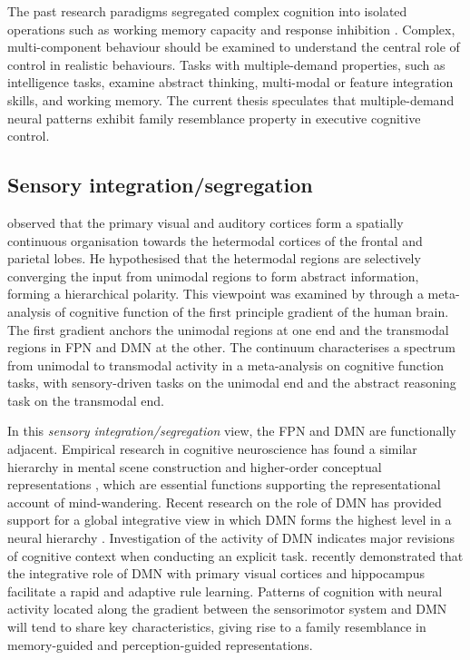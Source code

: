 The past research paradigms segregated complex cognition into isolated operations such as working memory capacity \cite{Vogel2004} and response inhibition \cite{Aron2004}. Complex, multi-component behaviour should be examined to understand the central role of control in realistic behaviours. Tasks with multiple-demand properties, such as intelligence tasks, examine abstract thinking, multi-modal or feature integration skills, and working memory. The current thesis speculates that multiple-demand neural patterns exhibit family resemblance property in executive cognitive control. 

\subsection{Sensory integration/segregation}
 observed that the primary visual and auditory cortices form a spatially continuous organisation towards the hetermodal cortices of the frontal and parietal lobes. He hypothesised that the hetermodal regions are selectively converging the input from unimodal regions to form abstract information, forming a hierarchical polarity. This viewpoint was examined by  through a meta-analysis of cognitive function of the first principle gradient of the human brain. The first gradient anchors the unimodal regions at one end and the transmodal regions in FPN and DMN at the other. The continuum characterises a spectrum from unimodal to transmodal activity in a meta-analysis on cognitive function tasks, with sensory-driven tasks on the unimodal end and the abstract reasoning task on the transmodal end.

In this \textit{sensory integration/segregation} view, the FPN and DMN are functionally adjacent. Empirical research in cognitive neuroscience has found a similar hierarchy in mental scene construction \cite{Villena-Gonzalez2018} and higher-order conceptual representations \cite{Murphy2018}, which are essential functions supporting the representational account of mind-wandering. Recent research on the role of DMN has provided support for a global integrative view in which DMN forms the highest level in a neural hierarchy \cite{Margulies2016}. Investigation of the activity of DMN indicates major revisions of cognitive context when conducting an explicit task.  recently demonstrated that the integrative role of DMN with primary visual cortices and hippocampus facilitate a rapid and adaptive rule learning. 
Patterns of cognition with neural activity located along the gradient between the sensorimotor system and DMN will tend to share key characteristics, giving rise to a family resemblance in memory-guided and perception-guided representations.


